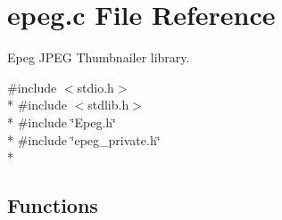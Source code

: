 \section{epeg.\+c File Reference}
\label{epeg_8c}


Epeg J\+P\+E\+G Thumbnailer library.  


{\ttfamily \#include $<$stdio.\+h$>$}\\*
{\ttfamily \#include $<$stdlib.\+h$>$}\\*
{\ttfamily \#include \char`\"{}Epeg.\+h\char`\"{}}\\*
{\ttfamily \#include \char`\"{}epeg\+\_\+private.\+h\char`\"{}}\\*
\subsection*{Functions}

